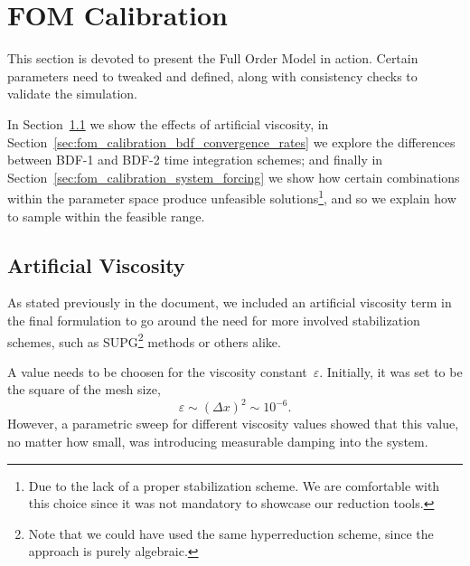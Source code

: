 \documentclass[../../thesis.tex]{subfiles}
\begin{document}
\section{FOM Calibration}
\label{sec:fom_calibration}
This section is devoted to present the Full Order Model in action.
Certain parameters need to tweaked and defined,
along with consistency checks to validate the simulation.

In Section~\ref{sec:fom_calibration_artificial_viscosity} we show the effects of artificial viscosity,
in Section~\ref{sec:fom_calibration_bdf_convergence_rates} we explore the differences 
between BDF-1 and BDF-2 time integration schemes;
and finally in Section~\ref{sec:fom_calibration_system_forcing} we show how
certain combinations within the parameter space produce unfeasible solutions\footnote{
    Due to the lack of a proper stabilization scheme. 
    We are comfortable with this choice since it was not mandatory to
    showcase our reduction tools.
}, 
and so we explain how to sample within the feasible range.

\subsection{Artificial Viscosity}
\label{sec:fom_calibration_artificial_viscosity}
As stated previously in the document, 
we included an artificial viscosity term in the final formulation
to go around the need for more involved stabilization schemes, such as SUPG\footnote{
Note that we could have used the same hyperreduction scheme,
since the approach is purely algebraic.} 
methods or others alike.

A value needs to be choosen for the viscosity constant~$\varepsilon$.
Initially, it was set to be the square of the mesh size, 
\begin{equation*}
    \varepsilon \sim (\Delta x)^2 \sim 10^{-6}.
\end{equation*}
However, a parametric sweep for different viscosity values showed that
this value, 
no matter how small, was introducing measurable damping into the system.
\end{document}
